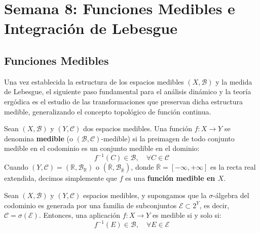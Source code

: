 
\chapter{Semana 8: Funciones Medibles e Integración de Lebesgue}

\section{Funciones Medibles}

Una vez establecida la estructura de los espacios medibles $(X, \mathcal{B})$ y la medida de Lebesgue, el siguiente paso fundamental para el análisis dinámico y la teoría ergódica es el estudio de las transformaciones que preservan dicha estructura medible, generalizando el concepto topológico de función continua.

\begin{definicion}
	Sean $(X, \mathcal{B})$ y $(Y, \mathcal{C})$ dos espacios medibles. Una función $f: X \to Y$ se denomina \textbf{medible} (o $(\mathcal{B}, \mathcal{C})$-medible) si la preimagen de todo conjunto medible en el codominio es un conjunto medible en el dominio:
	$$ f^{-1}(C) \in \mathcal{B}, \quad \forall C \in \mathcal{C} $$
	Cuando $(Y, \mathcal{C}) = (\mathbb{R}, \mathcal{B}_\mathbb{R})$ o $(\overline{\mathbb{R}}, \mathcal{B}_{\overline{\mathbb{R}}})$, donde $\overline{\mathbb{R}} = [-\infty, +\infty]$ es la recta real extendida, decimos simplemente que $f$ es una \textbf{función medible en $X$}.
\end{definicion}

\begin{proposicion}
	Sean $(X, \mathcal{B})$ y $(Y, \mathcal{C})$ espacios medibles, y supongamos que la $\sigma$-álgebra del codominio es generada por una familia de subconjuntos $\mathcal{E} \subset 2^Y$, es decir, $\mathcal{C} = \sigma(\mathcal{E})$. Entonces, una aplicación $f: X \to Y$ es medible si y solo si:
	$$ f^{-1}(E) \in \mathcal{B}, \quad \forall E \in \mathcal{E} $$
\end{proposicion}

